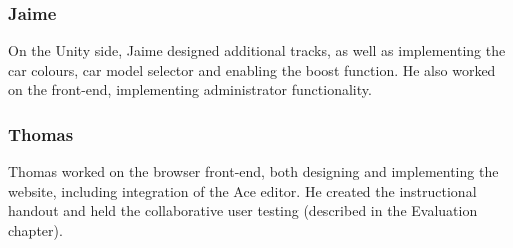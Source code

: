 \subsubsection{Jaime}
On the Unity side, Jaime designed additional tracks, as well as implementing the car colours, car model selector and enabling the boost function. He also worked on the front-end, implementing administrator functionality.  


\subsubsection{Thomas}
Thomas worked on the browser front-end, both designing and implementing the website, including integration of the Ace editor. He created the instructional handout and held the collaborative user testing (described in the Evaluation chapter).

